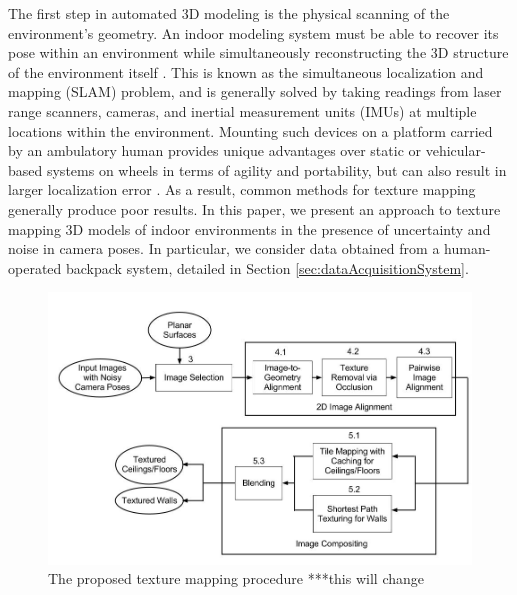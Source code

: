 \documentclass[]{spie}  %
\begin{document}
The first step in automated 3D modeling is the physical scanning of
the environment's geometry. An indoor modeling system must be able to
recover its pose within an environment while simultaneously
reconstructing the 3D structure of the environment itself
\cite{chen2010indoor, hz, kua2012loopclosure, liu2010indoor}. This is
known as the simultaneous localization and mapping (SLAM) problem, and
is generally solved by taking readings from laser range scanners,
cameras, and inertial measurement units (IMUs) at multiple locations
within the environment. Mounting such devices on a platform carried by
an ambulatory human provides unique advantages over static or
vehicular-based systems on wheels in terms of agility and portability,
but can also result in larger localization error
\cite{liu2010indoor}. As a result, common methods for texture mapping
generally produce poor results. In this paper, we present an approach
to texture mapping 3D models of indoor environments in the presence of
uncertainty and noise in camera poses. In particular, we consider data
obtained from a human-operated backpack system, detailed in Section
\ref{sec:dataAcquisitionSystem}.


\begin{figure}
  \centering
  \includegraphics[width=6in]{flowchart.jpg}
  \caption{The proposed texture mapping procedure ***this will
    change\\}
  \label{fig:flowchart}
\end{figure}
\end{document}
